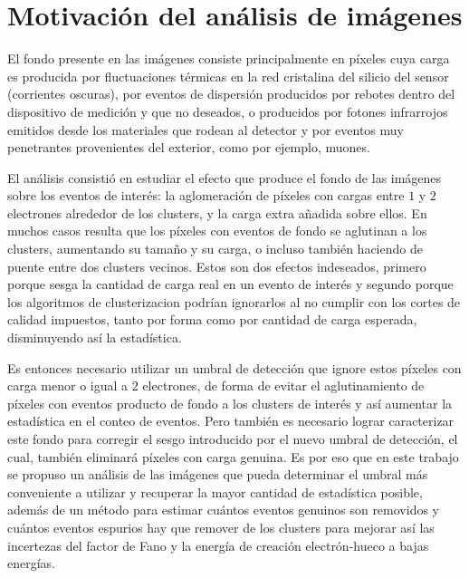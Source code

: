 \section{Motivación del análisis de imágenes}
\noindent El fondo presente en las imágenes consiste principalmente en píxeles cuya carga es producida por fluctuaciones térmicas en la red cristalina del silicio del sensor (corrientes oscuras), por eventos de dispersión producidos por rebotes dentro del dispositivo de medición y que no deseados, o producidos por fotones infrarrojos emitidos desde los materiales que rodean al detector y por eventos muy penetrantes provenientes del exterior, como por ejemplo, muones.

El análisis consistió en estudiar el efecto que produce el fondo de las imágenes sobre los eventos de interés: la aglomeración de píxeles con cargas entre $1$ y $2$ electrones alrededor de los clusters, y la carga extra añadida sobre ellos. En muchos casos resulta que los píxeles con eventos de fondo se aglutinan a los clusters, aumentando su tamaño y su carga, o incluso también haciendo de puente entre dos clusters vecinos. Estos son dos efectos indeseados, primero porque sesga la cantidad de carga real en un evento de interés y segundo porque los algoritmos de clusterizacion podrían ignorarlos al no cumplir con los cortes de calidad impuestos, tanto por forma como por cantidad de carga esperada, disminuyendo así la estadística.

Es entonces necesario utilizar un umbral de detección que ignore estos píxeles con carga menor o igual a $2$ electrones, de forma de evitar el aglutinamiento de píxeles con eventos producto de fondo a los clusters de interés y así aumentar la estadística en el conteo de eventos. Pero también es necesario lograr caracterizar este fondo para corregir el sesgo introducido por el nuevo umbral de detección, el cual, también eliminará píxeles con carga genuina. Es por eso que en este trabajo se propuso un análisis de las imágenes que pueda determinar el umbral más conveniente a utilizar y recuperar la mayor cantidad de estadística posible, además de un método para estimar cuántos eventos genuinos son removidos y cuántos eventos espurios hay que remover de los clusters para mejorar así las incertezas del factor de Fano y la energía de creación electrón-hueco a bajas energías.
